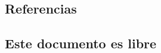 %
\subsection{Referencias}

  \begin{frame}{\insertsubsection}
    {}
    
  \end{frame}

%
\subsection{Este documento es libre}


